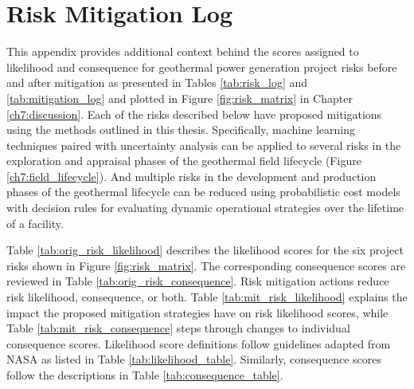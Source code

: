 \chapter{Risk Mitigation Log}\label{app:C_risk_log}

This appendix provides additional context behind the scores assigned to likelihood and consequence for geothermal power generation project risks before and after mitigation as presented in Tables \ref{tab:risk_log} and \ref{tab:mitigation_log} and plotted in Figure \ref{fig:risk_matrix} in Chapter \ref{ch7:discussion}. Each of the risks described below have proposed mitigations using the methods outlined in this thesis. Specifically, machine learning techniques paired with uncertainty analysis can be applied to several risks in the exploration and appraisal phases of the geothermal field lifecycle (Figure \ref{ch7:field_lifecycle}). And multiple risks in the development and production phases of the geothermal lifecycle can be reduced using probabilistic cost models with decision rules for evaluating dynamic operational strategies over the lifetime of a facility.

Table \ref{tab:orig_risk_likelihood} describes the likelihood scores for the six project risks shown in Figure \ref{fig:risk_matrix}. The corresponding consequence scores are reviewed in Table \ref{tab:orig_risk_consequence}. Risk mitigation actions reduce risk likelihood, consequence, or both. Table \ref{tab:mit_risk_likelihood} explains the impact the proposed mitigation strategies have on risk likelihood scores, while Table \ref{tab:mit_risk_consequence} steps through changes to individual consequence scores. Likelihood score definitions follow guidelines adapted from NASA as listed in Table \ref{tab:likelihood_table}. Similarly, consequence scores follow the descriptions in Table \ref{tab:consequence_table}.

